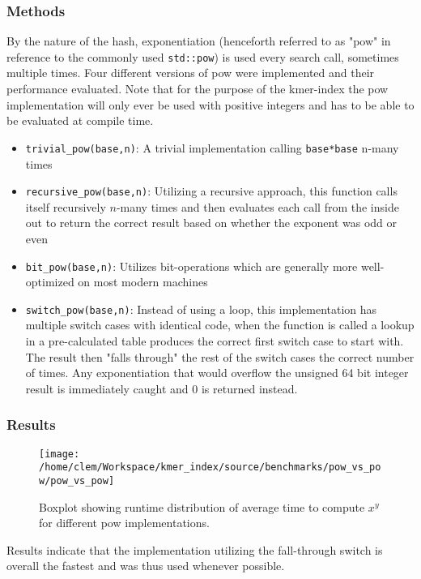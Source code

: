 \subsubsection{Methods}
By the nature of the hash, exponentiation (henceforth referred to
as "pow" in reference to the commonly used \lstinline{std::pow})
is used every search call, sometimes multiple times. Four different versions of pow were
implemented and their performance evaluated. \newpage Note that for the purpose of the kmer-index the pow implementation
will only ever be used with positive integers and has to be able to be evaluated at compile time.
\begin{itemize}
\item \lstinline{trivial_pow(base,n)}: A trivial implementation calling \lstinline{base*base} n-many
times
\item \lstinline{recursive_pow(base,n)}: Utilizing a recursive approach,
this function calls itself recursively $n$-many times and then evaluates
each call from the inside out to return the correct result based on
whether the exponent was odd or even
\item \lstinline{bit_pow(base,n)}: Utilizes bit-operations which are generally
more well-optimized on most modern machines
\item \lstinline{switch_pow(base,n)}: Instead of using a loop, this implementation
has multiple switch cases with identical code, when the function is
called a lookup in a pre-calculated table produces the correct first
switch case to start with. The result then "falls through" the rest
of the switch cases the correct number of times. Any exponentiation
that would overflow the unsigned 64 bit integer result is immediately
caught and 0 is returned instead.
\end{itemize}
\subsubsection{Results}
\begin{figure}[H]
\texttt{[image: /home/clem/Workspace/kmer\_index/source/benchmarks/pow\_vs\_pow/pow\_vs\_pow]}

\caption{Boxplot showing runtime distribution of average time to compute $x^{y}$ for different pow implementations.}
\end{figure}

Results indicate that the implementation utilizing the fall-through
switch is overall the fastest and was thus used whenever
possible.